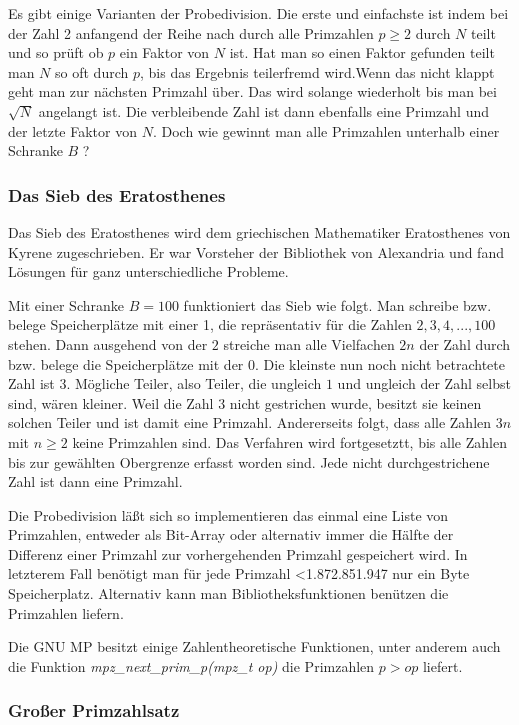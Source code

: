 \documentclass[a4paper,11pt]{article}
\begin{document}
Es gibt einige Varianten der Probedivision. Die erste und einfachste
ist indem bei der Zahl 2 anfangend der Reihe nach durch alle Primzahlen
$p\geq 2$ durch $N$ teilt und so prüft ob $p$ ein Faktor von $N$ ist.
Hat man so einen Faktor gefunden teilt man $N$ so oft durch $p$, bis
das Ergebnis teilerfremd wird.Wenn das nicht klappt
geht man zur nächsten Primzahl über. Das wird solange wiederholt bis
man bei $\sqrt{N}$ angelangt ist. Die verbleibende Zahl ist dann
ebenfalls eine Primzahl und der letzte Faktor von $N$. Doch wie gewinnt
man alle Primzahlen unterhalb einer Schranke $B$ ?

\subsubsection*{Das Sieb des Eratosthenes}

Das Sieb des Eratosthenes wird dem griechischen Mathematiker Eratosthenes
von Kyrene zugeschrieben. Er war Vorsteher der Bibliothek von Alexandria
und fand Lösungen für ganz unterschiedliche Probleme.

Mit einer Schranke $B=100$ funktioniert das Sieb wie folgt. Man schreibe
bzw. belege Speicherplätze mit einer 1, die repräsentativ für die Zahlen
$2, 3, 4, ... , 100$ stehen. Dann ausgehend von der $2$ streiche man
alle Vielfachen $2n$ der Zahl durch bzw. belege die Speicherplätze mit
der $0$. Die kleinste nun noch nicht betrachtete Zahl ist $3$. Mögliche
Teiler, also Teiler, die ungleich $1$ und ungleich der Zahl selbst sind,
wären kleiner. Weil die Zahl $3$ nicht gestrichen wurde, besitzt sie
keinen solchen Teiler und ist damit eine Primzahl. Andererseits folgt,
dass alle Zahlen $3n$ mit $n\geq2$ keine Primzahlen sind. Das Verfahren
wird fortgesetztt, bis alle Zahlen bis zur gewählten Obergrenze erfasst
worden sind. Jede nicht durchgestrichene Zahl ist dann eine Primzahl.

Die Probedivision läßt sich so implementieren das einmal eine Liste
von Primzahlen, entweder als Bit-Array oder alternativ immer
die Hälfte der Differenz einer Primzahl zur vorhergehenden Primzahl
gespeichert wird. In letzterem Fall benötigt man für jede
Primzahl <1.872.851.947 nur ein Byte Speicherplatz. Alternativ
kann man Bibliotheksfunktionen benützen die Primzahlen liefern.

Die GNU MP besitzt einige Zahlentheoretische Funktionen, unter anderem
auch die Funktion \textit{mpz\_next\_prim\_p(mpz\_t op)} die
Primzahlen $p > op$ liefert.

\subsubsection*{Großer Primzahlsatz}
\end{document}
